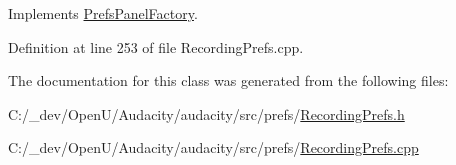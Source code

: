 Implements \hyperlink{class_prefs_panel_factory_a4814184d6050665a43f4929caa73aa0c}{Prefs\+Panel\+Factory}.



Definition at line 253 of file Recording\+Prefs.\+cpp.



The documentation for this class was generated from the following files\+:\begin{DoxyCompactItemize}
\item 
C\+:/\+\_\+dev/\+Open\+U/\+Audacity/audacity/src/prefs/\hyperlink{_recording_prefs_8h}{Recording\+Prefs.\+h}\item 
C\+:/\+\_\+dev/\+Open\+U/\+Audacity/audacity/src/prefs/\hyperlink{_recording_prefs_8cpp}{Recording\+Prefs.\+cpp}\end{DoxyCompactItemize}
